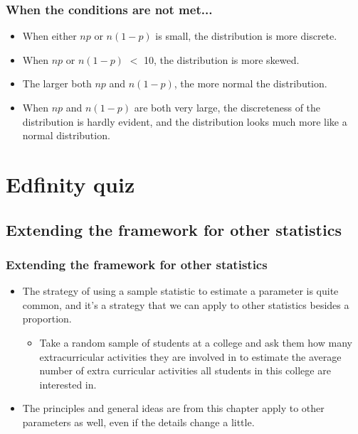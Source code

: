 \documentclass[t,compress,mathserif]{beamer}
\begin{document}

\begin{frame}
\frametitle{When the conditions are not met...}

\begin{itemize}

\item When either $np$ or $n(1-p)$ is small, the distribution is more discrete.
\item When $np$ or $n(1-p)$ $<$ 10, the distribution is more skewed.
\item The larger both $np$ and $n(1-p)$, the more normal the distribution.
\item When $np$ and $n(1-p)$ are both very large, the discreteness of the distribution is hardly evident, and the distribution looks much more like a normal distribution.

\end{itemize}

\end{frame}


\section{Edfinity quiz}



\subsection{Extending the framework for other statistics}


\begin{frame}
\frametitle{Extending the framework for other statistics}

\begin{itemize}

\item The strategy of using a sample statistic to estimate a parameter is quite common, and it's a strategy that we can apply to other statistics besides a proportion.

\begin{itemize}
\item Take a random sample of students at a college and ask them how many extracurricular activities they are involved in to estimate the average number of extra curricular activities all students in this college are interested in.
\end{itemize}

\item The principles and general ideas are from this chapter apply to other parameters as well, even if the details change a little. 

\end{itemize}

\end{frame}

\end{document}

